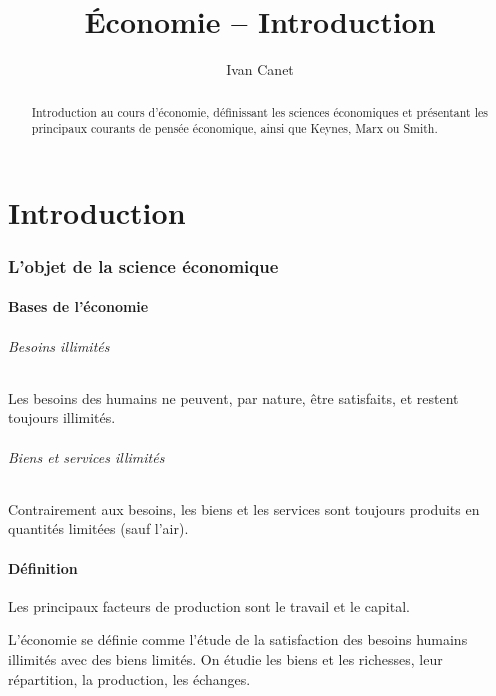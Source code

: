 \documentclass[10pt,a4paper,french]{article}
\begin{document}
\title{Économie -- Introduction}
\author{Ivan Canet}
\maketitle

\begin{abstract} %
Introduction au cours d'économie, définissant les sciences économiques et présentant les principaux courants de pensée économique, ainsi que Keynes, Marx ou Smith.
\end{abstract}

\tableofcontents

\part{Introduction}

\section{L'objet de la science économique}

\subsection{Bases de l'économie}

\paragraph{Besoins illimités}
Les besoins des humains ne peuvent, par nature, être satisfaits, et restent toujours illimités.

\paragraph{Biens et services illimités}
Contrairement aux besoins, les biens et les services sont toujours produits en quantités limitées (sauf l'air).

\subsection{Définition}

Les principaux facteurs de production sont le travail et le capital.
\begin{cquote}{}
L'économie se définie comme l'étude de la satisfaction des besoins humains illimités avec des biens limités. On étudie les biens et les richesses, leur répartition, la production, les échanges.
\end{cquote}
\end{document}

